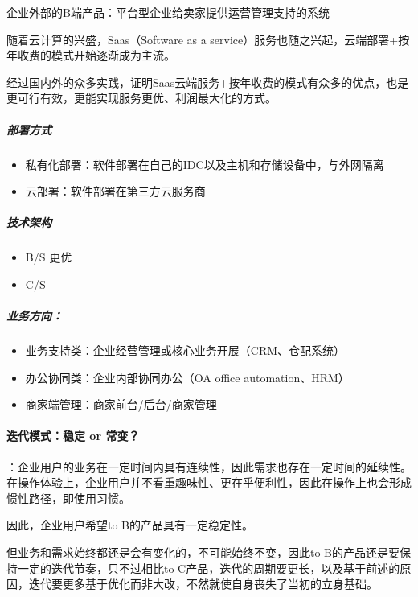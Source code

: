 \documentclass[letterpaper,11pt,english]{sphinxmanual}
\begin{document}
企业外部的B端产品：平台型企业给卖家提供运营管理支持的系统

随着云计算的兴盛，Saas（Software as a
service）服务也随之兴起，云端部署+按年收费的模式开始逐渐成为主流。

经过国内外的众多实践，证明Saas云端服务+按年收费的模式有众多的优点，也是更可行有效，更能实现服务更优、利润最大化的方式。


\subparagraph{部署方式}
\label{\detokenize{chapter_introduction/2B:id10}}\begin{itemize}
\item {} 
私有化部署：软件部署在自己的IDC以及主机和存储设备中，与外网隔离

\item {} 
云部署：软件部署在第三方云服务商

\end{itemize}


\subparagraph{技术架构}
\label{\detokenize{chapter_introduction/2B:id11}}\begin{itemize}
\item {} 
B/S 更优

\item {} 
C/S

\end{itemize}


\subparagraph{业务方向：}
\label{\detokenize{chapter_introduction/2B:id12}}\begin{itemize}
\item {} 
业务支持类：企业经营管理或核心业务开展（CRM、仓配系统）

\item {} 
办公协同类：企业内部协同办公（OA office automation、HRM）

\item {} 
商家端管理：商家前台/后台/商家管理

\end{itemize}


\paragraph{迭代模式：稳定 or 常变？}
\label{\detokenize{chapter_introduction/2B:or}}
：企业用户的业务在一定时间内具有连续性，因此需求也存在一定时间的延续性。在操作体验上，企业用户并不看重趣味性、更在乎便利性，因此在操作上也会形成惯性路径，即使用习惯。

因此，企业用户希望to B的产品具有一定稳定性。

但业务和需求始终都还是会有变化的，不可能始终不变，因此to
B的产品还是要保持一定的迭代节奏，只不过相比to
C产品，迭代的周期要更长，以及基于前述的原因，迭代要更多基于优化而非大改，不然就使自身丧失了当初的立身基础。
\end{document}
